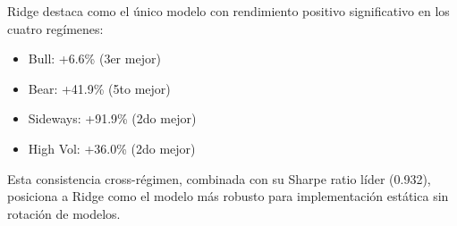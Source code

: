 Ridge destaca como el \'unico modelo con rendimiento positivo significativo en los cuatro reg\'imenes:

\begin{itemize}
    \item Bull: +6.6\% (3er mejor)
    \item Bear: +41.9\% (5to mejor)
    \item Sideways: +91.9\% (2do mejor)
    \item High Vol: +36.0\% (2do mejor)
\end{itemize}

Esta consistencia cross-r\'egimen, combinada con su Sharpe ratio l\'ider (0.932), posiciona a Ridge como el modelo m\'as robusto para implementaci\'on est\'atica sin rotaci\'on de modelos.
